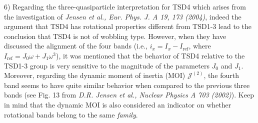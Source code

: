 \documentclass[11pt,a4paper]{article}
\begin{document}
6) Regarding the three-quasiparticle interpretation for TSD4 which arises from the investigation of \emph{Jensen et al., Eur. Phys. J. A 19, 173 (2004)}, indeed the argument that TSD4 has rotational properties different from TSD1-3 lead to the conclusion that TSD4 is not of wobbling type. However, when they have discussed the alignment of the four bands (i.e., $i_x=I_x-I_\text{ref}$, where $I_\text{ref}=J_0\omega+J_1\omega^3$), it was mentioned that the behavior of TSD4 relative to the TSD1-3 group is very sensitive to the magnitude of the parameters $J_0$ and $J_1$. Moreover, regarding the dynamic moment of inertia (MOI) $\mathcal{J}^{(2)}$, the fourth band seems to have quite similar behavior when compared to the previous three bands (see Fig. 13 from \emph{D.R. Jensen et al., Nuclear Physics A 703 (2002)}). Keep in mind that the dynamic MOI is also considered an indicator on whether rotational bands belong to the same \emph{family}.
\end{document}
